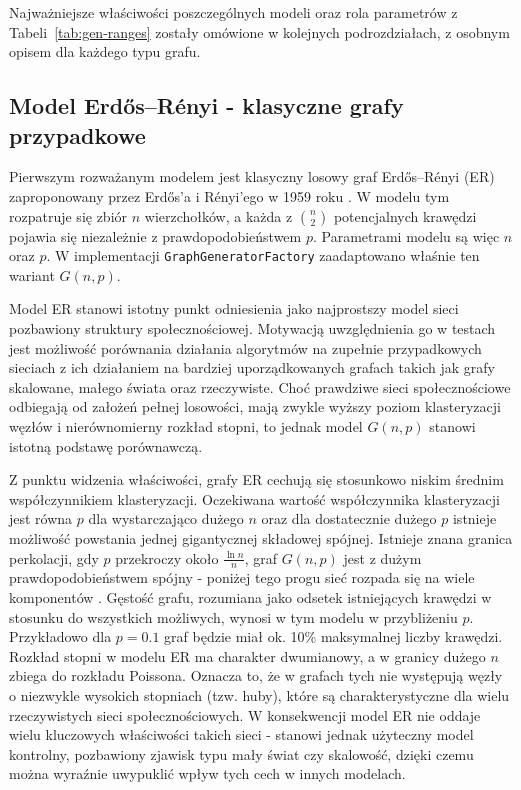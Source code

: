 Najważniejsze właściwości poszczególnych modeli oraz rola parametrów z Tabeli~\ref{tab:gen-ranges} zostały omówione w kolejnych podrozdziałach, z osobnym opisem dla każdego typu grafu.

\subsection{Model Erdős--Rényi - klasyczne grafy przypadkowe}
Pierwszym rozważanym modelem jest klasyczny losowy graf Erdős--Rényi (ER) zaproponowany przez Erd\H{o}s’a i Rényi’ego w 1959 roku \cite{ErdosRenyi1960}. W modelu tym rozpatruje się zbiór $n$ wierzchołków, a każda z $\binom{n}{2}$ potencjalnych krawędzi pojawia się niezależnie z prawdopodobieństwem $p$. Parametrami modelu są więc $n$ oraz $p$. W implementacji \texttt{GraphGeneratorFactory} zaadaptowano właśnie ten wariant $G(n,p)$.

Model ER stanowi istotny punkt odniesienia jako najprostszy model sieci pozbawiony struktury społecznościowej. Motywacją uwzględnienia go w testach jest możliwość porównania działania algorytmów na zupełnie przypadkowych sieciach z ich działaniem na bardziej uporządkowanych grafach takich jak grafy skalowane, małego świata oraz rzeczywiste. Choć prawdziwe sieci społecznościowe odbiegają od założeń pełnej losowości, mają zwykle wyższy poziom klasteryzacji węzłów i nierównomierny rozkład stopni, to jednak model $G(n, p)$ stanowi istotną podstawę porównawczą.

Z punktu widzenia właściwości, grafy ER cechują się stosunkowo niskim średnim współczynnikiem klasteryzacji. Oczekiwana wartość współczynnika klasteryzacji jest równa $p$ dla wystarczająco dużego $n$ oraz dla dostatecznie dużego $p$ istnieje możliwość powstania jednej gigantycznej składowej spójnej. Istnieje znana granica perkolacji, gdy $p$ przekroczy około $\frac{\ln n}{n}$, graf $G(n, p)$ jest z dużym prawdopodobieństwem spójny - poniżej tego progu sieć rozpada się na wiele komponentów \cite{ErdosRenyi1960}. Gęstość grafu, rozumiana jako odsetek istniejących krawędzi w stosunku do wszystkich możliwych, wynosi w tym modelu w przybliżeniu $p$. Przykładowo dla $p=0.1$ graf będzie miał ok. 10\% maksymalnej liczby krawędzi. Rozkład stopni w modelu ER ma charakter dwumianowy, a w granicy dużego $n$ zbiega do rozkładu Poissona. Oznacza to, że w grafach tych nie występują węzły o niezwykle wysokich stopniach (tzw. huby), które są charakterystyczne dla wielu rzeczywistych sieci społecznościowych. W konsekwencji model ER nie oddaje wielu kluczowych właściwości takich sieci - stanowi jednak użyteczny model kontrolny, pozbawiony zjawisk typu mały świat czy skalowość, dzięki czemu można wyraźnie uwypuklić wpływ tych cech w innych modelach.


